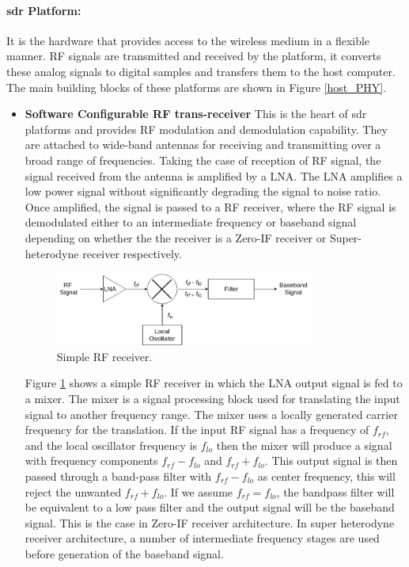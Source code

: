 \paragraph{\ac{sdr} Platform:} It is the hardware that provides access to the wireless medium in a flexible manner.
\ac{RF} signals are transmitted and received by the platform, it converts these analog signals to digital samples and transfers them to the host computer.
The main building blocks of these platforms are shown in Figure \ref{host_PHY}.
\begin{itemize}
\item{\textbf{Software Configurable \ac{RF} trans-receiver}} This is the heart of \ac{sdr} platforms and provides \ac{RF} modulation and demodulation capability.
They are attached to wide-band antennas for receiving and transmitting over a broad range of frequencies.
Taking the case of reception of RF signal, the signal received from the antenna is amplified by a \ac{LNA}.
The \ac{LNA} amplifies a low power signal without significantly degrading the signal to noise ratio.
Once amplified, the signal is passed to a \ac{RF} receiver, where the \ac{RF} signal is demodulated either to an intermediate frequency or baseband signal depending on whether the the receiver is a Zero-IF receiver or Super-heterodyne receiver respectively.\\

\begin{figure}[h!]
\centering
\includegraphics[width=0.8\textwidth]{Figure/RF_receiver.png}
\caption{Simple \ac{RF} receiver.}
\label{rf_receiver}
\end{figure}

Figure \ref{rf_receiver} shows a simple \ac{RF} receiver in which the \ac{LNA} output signal is fed to a mixer.
The mixer is a signal processing block used for translating the input signal to another frequency range.
The mixer uses a locally generated carrier frequency for the translation. 
If the input \ac{RF} signal has a frequency of $f_{rf}$, and the local oscillator frequency is $f_{lo}$ then the mixer will produce a signal with frequency components $f_{rf}-f_{lo}$ and $f_{rf}+f_{lo}$.
This output signal is then passed through a band-pass filter with $f_{rf}-f_{lo}$ as center frequency, this will reject the unwanted $f_{rf}+f_{lo}$.
If we assume $f_{rf}=f_{lo}$, the bandpass filter will be equivalent to a low pass filter and the output signal will be the baseband signal.
This is the case in Zero-IF receiver architecture.
In super heterodyne receiver architecture, a number of intermediate frequency stages are used before generation of the baseband signal.\\


\end{itemize}
